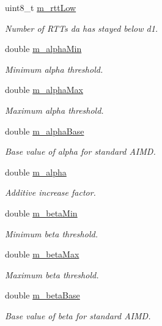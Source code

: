 \begin{DoxyCompactItemize}
uint8\+\_\+t \hyperlink{classns3_1_1TcpIllinois_a6acfa8c3874438bb8105779da78d2f02}{m\+\_\+rtt\+Low}
\begin{DoxyCompactList}\small\item\em Number of R\+T\+Ts da has stayed below d1. \end{DoxyCompactList}\item 
double \hyperlink{classns3_1_1TcpIllinois_a5762b0230b8817d99f8b52cabe27c6fc}{m\+\_\+alpha\+Min}
\begin{DoxyCompactList}\small\item\em Minimum alpha threshold. \end{DoxyCompactList}\item 
double \hyperlink{classns3_1_1TcpIllinois_ad9a94e71f8a53c481825f777f1aa6ded}{m\+\_\+alpha\+Max}
\begin{DoxyCompactList}\small\item\em Maximum alpha threshold. \end{DoxyCompactList}\item 
double \hyperlink{classns3_1_1TcpIllinois_a08e136c96d7a6e38606cd0885aa131d7}{m\+\_\+alpha\+Base}
\begin{DoxyCompactList}\small\item\em Base value of alpha for standard A\+I\+MD. \end{DoxyCompactList}\item 
double \hyperlink{classns3_1_1TcpIllinois_a7c7f06e3410d0647b6a262c2cef723ba}{m\+\_\+alpha}
\begin{DoxyCompactList}\small\item\em Additive increase factor. \end{DoxyCompactList}\item 
double \hyperlink{classns3_1_1TcpIllinois_a3c0c450a135f937b79940f82c67313d9}{m\+\_\+beta\+Min}
\begin{DoxyCompactList}\small\item\em Minimum beta threshold. \end{DoxyCompactList}\item 
double \hyperlink{classns3_1_1TcpIllinois_a8c27408a958faaf52111b0f62b8c81a5}{m\+\_\+beta\+Max}
\begin{DoxyCompactList}\small\item\em Maximum beta threshold. \end{DoxyCompactList}\item 
double \hyperlink{classns3_1_1TcpIllinois_a934a50369de8be5dc9377f0460d5a7e1}{m\+\_\+beta\+Base}
\begin{DoxyCompactList}\small\item\em Base value of beta for standard A\+I\+MD. \end{DoxyCompactList}\item 

\end{DoxyCompactItemize}
